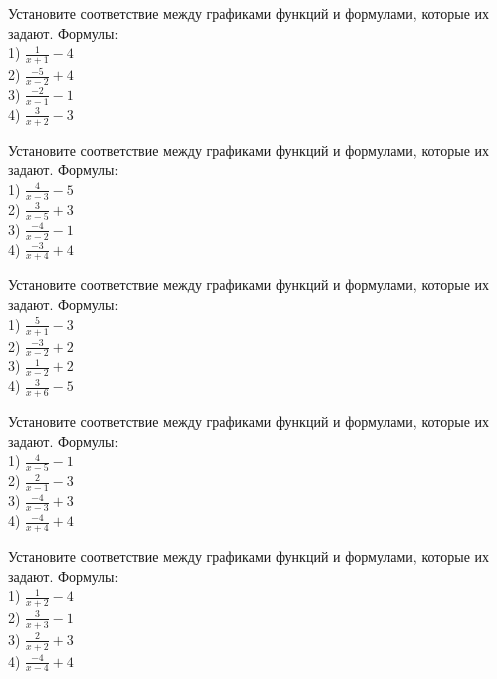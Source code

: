 \documentclass[4apaper]{article}
\begin{document}
\begin{taskBN}{36}
Установите соответствие между графиками функций и формулами, которые их задают. Формулы: \\1) $\frac{1}{x+1}-4$\\2) $\frac{-5}{x-2}+4$\\3) $\frac{-2}{x-1}-1$\\4) $\frac{3}{x+2}-3$
\end{taskBN}

\begin{taskBN}{37}
Установите соответствие между графиками функций и формулами, которые их задают. Формулы: \\1) $\frac{4}{x-3}-5$\\2) $\frac{3}{x-5}+3$\\3) $\frac{-4}{x-2}-1$\\4) $\frac{-3}{x+4}+4$
\end{taskBN}

\begin{taskBN}{38}
Установите соответствие между графиками функций и формулами, которые их задают. Формулы: \\1) $\frac{5}{x+1}-3$\\2) $\frac{-3}{x-2}+2$\\3) $\frac{1}{x-2}+2$\\4) $\frac{3}{x+6}-5$
\end{taskBN}

\begin{taskBN}{39}
Установите соответствие между графиками функций и формулами, которые их задают. Формулы: \\1) $\frac{4}{x-5}-1$\\2) $\frac{2}{x-1}-3$\\3) $\frac{-4}{x-3}+3$\\4) $\frac{-4}{x+4}+4$
\end{taskBN}

\begin{taskBN}{40}
Установите соответствие между графиками функций и формулами, которые их задают. Формулы: \\1) $\frac{1}{x+2}-4$\\2) $\frac{3}{x+3}-1$\\3) $\frac{2}{x+2}+3$\\4) $\frac{-4}{x-4}+4$
\end{taskBN}
\end{document}
